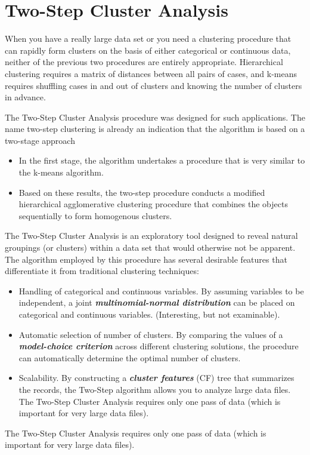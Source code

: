 \documentclass[a4paper,12pt]{report}
\begin{document}
\section{Two-Step Cluster Analysis}

When you have a really large data set or you need a clustering procedure that can rapidly form clusters on the basis of either categorical or continuous data, neither of the previous two procedures are entirely appropriate. Hierarchical clustering requires a matrix of distances between all pairs of cases, and k-means requires shuffling cases in and out of clusters and knowing the number of clusters in advance.

The Two-Step Cluster Analysis procedure was designed for such applications. The name two-step clustering is already an indication that the algorithm is based on a two-stage approach
\begin{itemize}
	\item In the first stage, the algorithm undertakes a procedure that is very similar to the k-means algorithm. \item Based on these results, the two-step
	procedure conducts a modified hierarchical agglomerative clustering procedure that
	combines the objects sequentially to form homogenous clusters.
\end{itemize}

The Two-Step Cluster Analysis is an exploratory tool designed to reveal natural groupings (or clusters) within a data set that would otherwise not be apparent. The algorithm employed by this procedure has several desirable features that differentiate it from traditional clustering techniques:

\begin{itemize}
	\item Handling of categorical and continuous variables. By assuming variables to be independent, a joint \textbf{\textit{multinomial-normal distribution}} can be placed on categorical and continuous variables. (Interesting, but not examinable).
	
	\item Automatic selection of number of clusters. By comparing the values of a \textbf{\textit{model-choice criterion}} across different clustering solutions, the procedure can automatically determine the optimal number of clusters.
	
	\item Scalability. By constructing a \textbf{\textit{cluster features}} (CF) tree that summarizes the records, the Two-Step algorithm allows you to analyze large data files. The Two-Step Cluster Analysis requires only one pass of data (which is important for very large data files).
	
\end{itemize}
The Two-Step Cluster Analysis requires only one pass of data
(which is important for very large data files).
\end{document}

